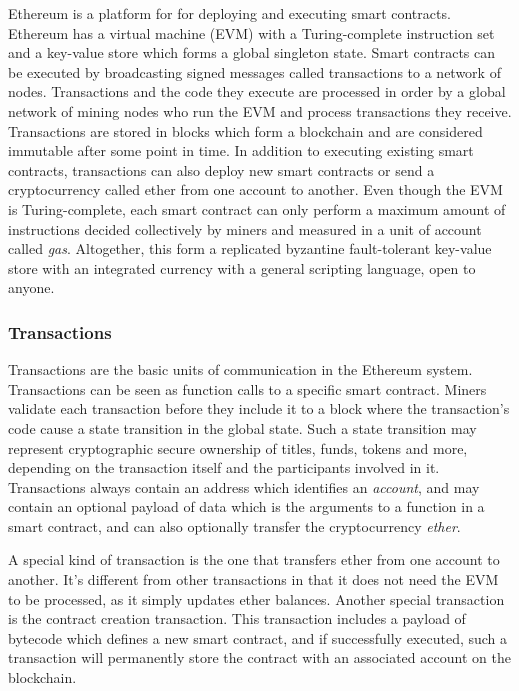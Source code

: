 Ethereum \cite{wood2018ethereum} is a platform for for deploying and executing smart contracts. Ethereum has a virtual machine (EVM) with a Turing-complete instruction set and a key-value store which forms a global singleton state. Smart contracts can be executed by broadcasting signed messages called transactions to a network of nodes. Transactions and the code they execute are processed in order by a global network of mining nodes who run the EVM and process transactions they receive. Transactions are stored in blocks which form a blockchain and are considered immutable after some point in time. In addition to executing existing smart contracts, transactions can also deploy new smart contracts or send a cryptocurrency called ether from one account to another. Even though the EVM is Turing-complete, each smart contract can only perform a maximum amount of instructions decided collectively by miners and measured in a unit of account called \emph{gas}. Altogether, this form a replicated byzantine fault-tolerant key-value store with an integrated currency with a general scripting language, open to anyone.

\subsubsection{Transactions}
Transactions are the basic units of communication in the Ethereum system. Transactions can be seen as function calls to a specific smart contract. Miners validate each transaction before they include it to a block where the transaction's code cause a state transition in the global state. Such a state transition may represent cryptographic secure ownership of titles, funds, tokens and more, depending on the transaction itself and the participants involved in it. Transactions always contain an address which identifies an \emph{account}, and may contain an optional payload of data which is the arguments to a function in a smart contract, and can also optionally transfer the cryptocurrency \emph{ether}. 

A special kind of transaction is the one that transfers ether from one account to another. It's different from other transactions in that it does not need the EVM to be processed, as it simply updates ether balances. Another special transaction is the contract creation transaction. This transaction includes a payload of bytecode which defines a new smart contract, and if successfully executed, such a transaction will permanently store the contract with an associated account on the blockchain.


